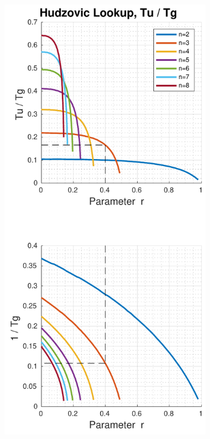 \begin{figure}
     \centering
     \begin{subfigure}[b]{0.8\textwidth}
         \includegraphics[width=1\linewidth]{images/hudzovic_curves_tu_tg}

\end{subfigure}
\end{figure}
